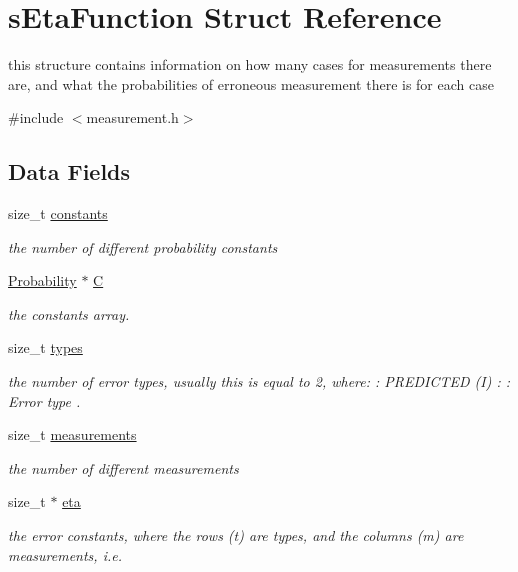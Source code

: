 \hypertarget{structsEtaFunction}{\section{s\-Eta\-Function \-Struct \-Reference}
\label{structsEtaFunction}
}


this structure contains information on how many cases for measurements there are, and what the probabilities of erroneous measurement there is for each case  




{\ttfamily \#include $<$measurement.\-h$>$}

\subsection*{\-Data \-Fields}
\begin{DoxyCompactItemize}
\item 
size\-\_\-t \hyperlink{structsEtaFunction_a1fdf63f3a73e7fd663491e72421619f9}{constants}
\begin{DoxyCompactList}\small\item\em the number of different probability constants \end{DoxyCompactList}\item 
\hyperlink{common_2measurement_8h_ae6d7a8c80f18bc080ab1cfa38d119724}{\-Probability} $\ast$ \hyperlink{structsEtaFunction_a05c2f93c1148d5268d359d78540c10be}{\-C}
\begin{DoxyCompactList}\small\item\em the constants array. \end{DoxyCompactList}\item 
size\-\_\-t \hyperlink{structsEtaFunction_afd94a9856047e0987c5e8667a4838b71}{types}
\begin{DoxyCompactList}\small\item\em the number of error types, usually this is equal to 2, where\-: \-: \-P\-R\-E\-D\-I\-C\-T\-E\-D (\-I) \-: \-: \-Error type . \end{DoxyCompactList}\item 
size\-\_\-t \hyperlink{structsEtaFunction_aa323ef11935cd1e8d6ef56405ab96cf8}{measurements}
\begin{DoxyCompactList}\small\item\em the number of different measurements \end{DoxyCompactList}\item 
size\-\_\-t $\ast$ \hyperlink{structsEtaFunction_a7585a59b1861523157055f8c8b0263e3}{eta}
\begin{DoxyCompactList}\small\item\em the error constants, where the rows (t) are types, and the columns (m) are measurements, i.\-e. \end{DoxyCompactList}\end{DoxyCompactItemize}



